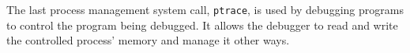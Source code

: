 \documentclass{book}
\newcommand {\cmd} [1] {\texttt{#1}}
\begin{document}
The last process management system call, \cmd{ptrace}, is used by debugging programs to control the program being debugged.
It allows the debugger to read and write the controlled process' memory and manage it other ways.


 




 










\end{document}
